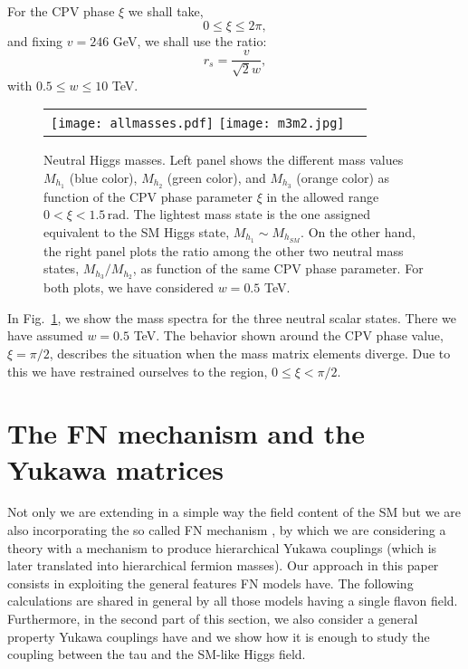 \documentclass[aps,prd,groupaddress,floatfix,tighten,nofootinbib,showpacs,
amsfonts,superscriptaddress]{revtex4}
\def\be{\begin{equation}}
\def\ee{\end{equation}}
\begin{document}
For the CPV phase $\xi$ we shall take,
%
\be
 0 \leq \xi \leq 2 \pi,
\ee
%
and fixing $v=246$ GeV, we shall use the ratio:
%
\be
r_s = \frac{v}{ \sqrt{2} w} , 
\ee
%
with $0.5 \leq w \leq 10$ TeV.
%
\begin{figure}[t]
 \begin{center}
  \begin{tabular}{cc}
\texttt{[image: allmasses.pdf]}  
\texttt{[image: m3m2.jpg]}
        \end{tabular}
  \caption{Neutral Higgs masses. Left panel shows the different mass values $M_{h_1}$ (blue color), $M_{h_2}$ (green color), and $M_{h_3}$ (orange color) as function of the CPV phase parameter $\xi$ in the allowed range $0<\xi<1.5\,{\textrm{rad}}$. The lightest mass state is the one assigned equivalent to the SM Higgs state, $M_{h_1} \sim M_{h_{SM}}$. On the other hand, the right panel plots the ratio among the other two neutral mass states, $M_{h_3}/M_{h_2}$, as function of the same CPV phase parameter. For both plots, we have considered $w=0.5$ TeV.}
   \label{Fig:masses1}
 \end{center}
\end{figure}
%

In Fig.~\ref{Fig:masses1}, we show the mass spectra for the three neutral scalar states. There we have assumed $w=0.5$ TeV. The behavior shown around the CPV phase value, $\xi = \pi/2$, describes the situation when the mass matrix elements diverge. Due to this we have restrained ourselves to the region, $0 \leq \xi <\pi/2$.


\section{The FN mechanism  and the Yukawa matrices\label{Sec:Matrices}}
Not only we are extending in a simple way the field content of the SM but 
we are also incorporating the so called FN mechanism \cite{Froggatt:1978nt}, by which we are considering a theory with a mechanism to produce hierarchical Yukawa couplings (which is later translated into hierarchical fermion masses). Our approach in this paper consists in exploiting the general features FN models have. The following calculations are shared in general by all those models having a single flavon field. Furthermore, {in the second part of this section}, we also consider a general property Yukawa couplings have and we show how it is enough to study the coupling between the tau and the {SM-like} Higgs field. 
\end{document}
